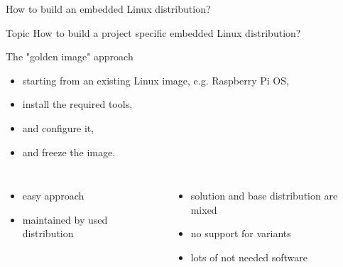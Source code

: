 \documentclass{beamer}
\newcommand\pro{\item[$+$]}
\newcommand\con{\item[$-$]}
\begin{document}
\begin{frame}{How to build an embedded Linux distribution?}
	\begin{block}{Topic}
		How to build a project specific embedded Linux distribution?
	\end{block}
\end{frame}

\begin{frame}{The "golden image" approach}
	\begin{itemize}
		\item starting from an existing Linux image, e.g. Raspberry Pi OS,
		\item install the required tools,
		\item and configure it,
		\item and freeze the image.
	\end{itemize}

	\begin{columns}[t]
        \centering
        \begin{itemize}
			\pro easy approach
			\pro maintained by used distribution
		\end{itemize}        
        \centering
        \begin{itemize}
        		\con solution and base distribution are mixed
        		\con no support for variants
        		\con lots of not needed software
        \end{itemize}
    \end{columns}
\end{frame}
\end{document}
